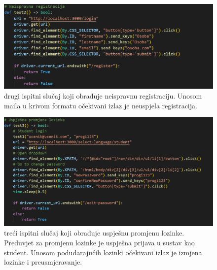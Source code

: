 \begin{figure}[htp]
    \caption{drugi ispitni slučaj koji obrađuje neispravnu registraciju. Unosom maila u krivom formatu očekivani izlaz je neuspjela registracija.}
    \includegraphics[scale=0.5]{dijagrami/test2.png}
    \centering
    
\end{figure}
\break

\begin{figure}[htp]
    \caption{treći ispitni slučaj koji obrađuje uspješnu promjenu lozinke. Preduvjet za promjenu lozinke je uspješna prijava u sustav kao student. Unosom podudarajućih lozinki očekivani izlaz je izmjena lozinke i preusmjeravanje.}
    \includegraphics[scale=0.5]{dijagrami/test3.png}
    \centering
    
\end{figure}
\break

